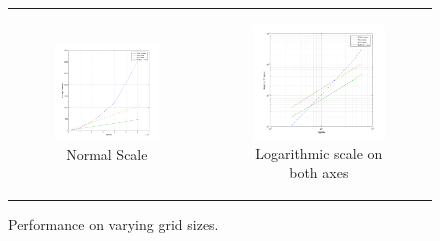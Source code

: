 \begin{figure}
\begin{center}
	\begin{tabular}{c c}
		\begin{subfigure}[b]{0.5\textwidth}
			\centering
			\includegraphics[width=1\textwidth, angle=0]{./fig/sir/stm_io_repast_varyinggrid_performance.png}
			\caption{Normal Scale}
		\end{subfigure}
    	&
		\begin{subfigure}[b]{0.5\textwidth}
			\centering
			\includegraphics[width=1\textwidth, angle=0]{./fig/sir/stm_io_repast_varyinggrid_performance_loglog.png}
			\caption{Logarithmic scale on both axes}
		\end{subfigure}
    \end{tabular}
	\caption{Performance on varying grid sizes.}
	\label{fig:varyinggrid_constcores}
\end{center}
\end{figure}

